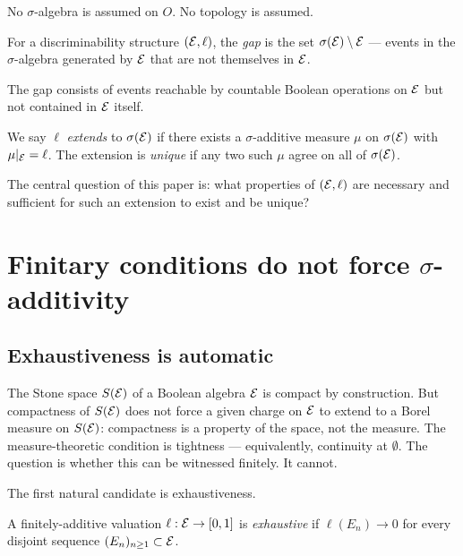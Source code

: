 \noindent No $\sigma$-algebra is assumed on $O$.  No topology is assumed.

\begin{definition}[Gap]
\label{def:gap}
For a discriminability structure $(\mathcal{E}, \ell)$, the \emph{gap} is the set
$\sigma(\mathcal{E}) \setminus \mathcal{E}$ --- events in the $\sigma$-algebra generated by $\mathcal{E}$ that are
not themselves in $\mathcal{E}$.
\end{definition}

\noindent The gap consists of events reachable by countable Boolean operations on
$\mathcal{E}$ but not contained in $\mathcal{E}$ itself.

\begin{definition}[Extension]
We say $\ell$ \emph{extends} to $\sigma(\mathcal{E})$ if there exists a $\sigma$-additive measure
$\mu$ on $\sigma(\mathcal{E})$ with $\mu|_{\mathcal{E}} = \ell$.  The extension is \emph{unique} if any two
such $\mu$ agree on all of $\sigma(\mathcal{E})$.
\end{definition}

\noindent The central question of this paper is: what properties of $(\mathcal{E}, \ell)$ are
necessary and sufficient for such an extension to exist and be unique?

\section{Finitary conditions do not force $\sigma$-additivity}
\label{sec:negative}

\subsection{Exhaustiveness is automatic}

The Stone space $S(\mathcal{E})$ of a Boolean algebra $\mathcal{E}$ is compact by construction.
But compactness of $S(\mathcal{E})$ does not force a given charge on $\mathcal{E}$ to extend to a
Borel measure on $S(\mathcal{E})$: compactness is a property of the space, not the measure.
The measure-theoretic condition is tightness --- equivalently, continuity at
$\emptyset$.  The question is whether this can be witnessed finitely.  It cannot.

The first natural candidate is exhaustiveness.

\begin{definition}[Exhaustiveness]
A finitely-additive valuation $\ell : \mathcal{E} \to [0,1]$ is \emph{exhaustive} if
$\ell(E_n) \to 0$ for every disjoint sequence $(E_n)_{n \geq 1} \subset \mathcal{E}$.
\end{definition}

